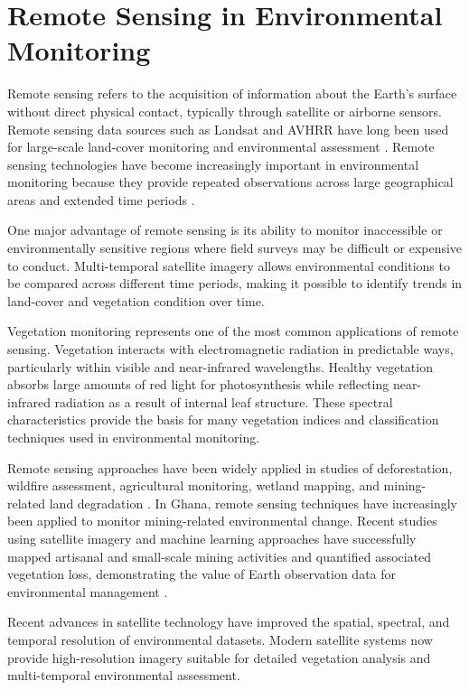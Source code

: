 \documentclass[a4paper,12pt]{report}
\begin{document}
\section{Remote Sensing in Environmental Monitoring}

Remote sensing refers to the acquisition of information about the Earth’s surface without direct physical contact, typically through satellite or airborne sensors. Remote sensing data sources such as Landsat and AVHRR have long been used for large-scale land-cover monitoring and environmental assessment \citep{townshend1992landsat}. Remote sensing technologies have become increasingly important in environmental monitoring because they provide repeated observations across large geographical areas and extended time periods \citep{richards2013remote,xu2013review,wulder2004forest}.

One major advantage of remote sensing is its ability to monitor inaccessible or environmentally sensitive regions where field surveys may be difficult or expensive to conduct. Multi-temporal satellite imagery allows environmental conditions to be compared across different time periods, making it possible to identify trends in land-cover and vegetation condition over time.

Vegetation monitoring represents one of the most common applications of remote sensing. Vegetation interacts with electromagnetic radiation in predictable ways, particularly within visible and near-infrared wavelengths. Healthy vegetation absorbs large amounts of red light for photosynthesis while reflecting near-infrared radiation as a result of internal leaf structure. These spectral characteristics provide the basis for many vegetation indices and classification techniques used in environmental monitoring.

Remote sensing approaches have been widely applied in studies of deforestation, wildfire assessment, agricultural monitoring, wetland mapping, and mining-related land degradation \citep{cohen1992estimating}. In Ghana, remote sensing techniques have increasingly been applied to monitor mining-related environmental change. Recent studies using satellite imagery and machine learning approaches have successfully mapped artisanal and small-scale mining activities and quantified associated vegetation loss, demonstrating the value of Earth observation data for environmental management \citep{barenblitt2021ghana,gallwey2020sentinel}. 

Recent advances in satellite technology have improved the spatial, spectral, and temporal resolution of environmental datasets. Modern satellite systems now provide high-resolution imagery suitable for detailed vegetation analysis and multi-temporal environmental assessment.
\end{document}
